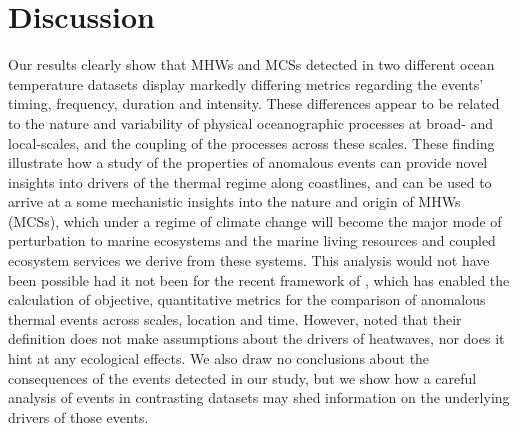 \documentclass[a4paper,10pt,review]{elsarticle}
\begin{document}
\section{Discussion}
Our results clearly show that MHWs and MCSs detected in two different ocean temperature datasets display markedly differing metrics regarding the events' timing, frequency, duration and intensity. These differences appear to be related to the nature and variability of physical oceanographic processes at broad- and local-scales, and the coupling of the processes across these scales. These finding illustrate how a study of the properties of anomalous events can provide novel insights into drivers of the thermal regime along coastlines, and can be used to arrive at a some mechanistic insights into the nature and origin of MHWs (MCSs), which under a regime of climate change will become the major mode of perturbation to marine ecosystems and the marine living resources and coupled ecosystem services we derive from these systems. This analysis would not have been possible had it not been for the recent framework of \citet{Hobday2016}, which has enabled the calculation of objective, quantitative metrics for the comparison of anomalous thermal events across scales, location and time. However, \citet{Hobday2016} noted that their definition does not make assumptions about the drivers of heatwaves, nor does it hint at any ecological effects. We also draw no conclusions about the consequences of the events detected in our study, but we show how a careful analysis of events in contrasting datasets may shed information on the underlying drivers of those events.
\end{document}
